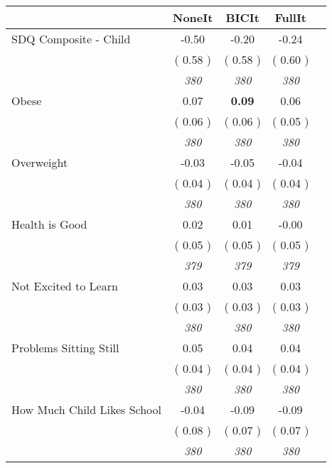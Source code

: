 \begin{tabular}{l c c c c}
\toprule
 & NoneIt & BICIt & FullIt \\
\midrule
SDQ Composite - Child &     -0.50 &     -0.20 &     -0.24 \\
& (     0.58 ) & (     0.58 ) & (     0.60 ) \\
& \textit{ 380 } & \textit{ 380 } & \textit{ 380 } \\
Obese &      0.07 & \textbf{      0.09 } &      0.06 \\
& (     0.06 ) & (     0.06 ) & (     0.05 ) \\
& \textit{ 380 } & \textit{ 380 } & \textit{ 380 } \\
Overweight &     -0.03 &     -0.05 &     -0.04 \\
& (     0.04 ) & (     0.04 ) & (     0.04 ) \\
& \textit{ 380 } & \textit{ 380 } & \textit{ 380 } \\
Health is Good &      0.02 &      0.01 &     -0.00 \\
& (     0.05 ) & (     0.05 ) & (     0.05 ) \\
& \textit{ 379 } & \textit{ 379 } & \textit{ 379 } \\
Not Excited to Learn &      0.03 &      0.03 &      0.03 \\
& (     0.03 ) & (     0.03 ) & (     0.03 ) \\
& \textit{ 380 } & \textit{ 380 } & \textit{ 380 } \\
Problems Sitting Still &      0.05 &      0.04 &      0.04 \\
& (     0.04 ) & (     0.04 ) & (     0.04 ) \\
& \textit{ 380 } & \textit{ 380 } & \textit{ 380 } \\
How Much Child Likes School &     -0.04 &     -0.09 &     -0.09 \\
& (     0.08 ) & (     0.07 ) & (     0.07 ) \\
& \textit{ 380 } & \textit{ 380 } & \textit{ 380 } \\
\bottomrule
\end{tabular}
